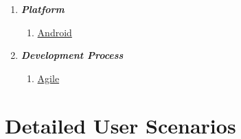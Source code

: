 \documentclass{article}
\begin{document}
\begin{enumerate}
\item \textbf{\textit{Platform}}
    \begin{enumerate}[label*=\arabic*.]
        \item{\href{https://www.android.com/}{Android}}
    \end{enumerate}

\item \textbf{\textit{Development Process}}
    \begin{enumerate}[label*=\arabic*.]
        \item{\href{https://agilemanifesto.org/}{Agile}}
    \end{enumerate}


\end{enumerate}

\section*{Detailed User Scenarios }
\end{document}
